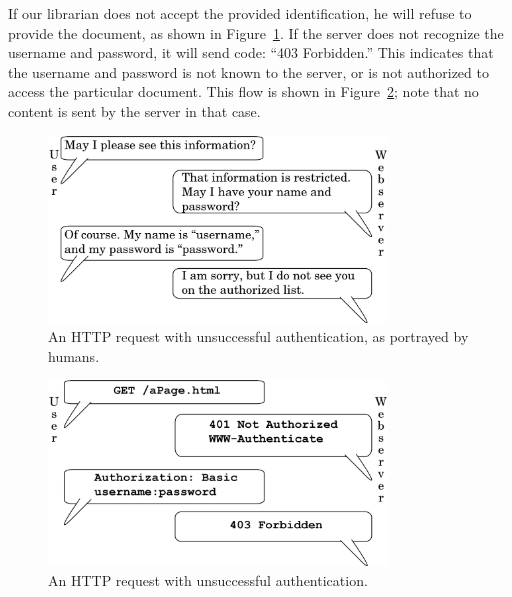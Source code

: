 \documentclass{article}
\begin{document}
	If our librarian does not accept the provided identification, he will refuse to provide the document, as shown in Figure~\ref{fig:humauthfail}. If the server does not recognize the username and password, it will send code: ``403 Forbidden.'' This indicates that the username and password is not known to the server, or is not authorized to access the particular document. This flow is shown in Figure~\ref{fig:compauthfail}; note that no content is sent by the server in that case.
	
	\begin{figure}[ht!]
	  \centering
	  \includegraphics[width=0.8\textwidth]{diagrams/authfail2}
	  \caption{An HTTP request with unsuccessful authentication, as portrayed by humans.}
		\label{fig:humauthfail}
	\end{figure}
	
	\begin{figure}[ht!]
	  \centering
	  \includegraphics[width=0.8\textwidth]{diagrams/authfail2-2}
	  \caption{An HTTP request with unsuccessful authentication.}
		\label{fig:compauthfail}
	\end{figure}
	
\end{document}
